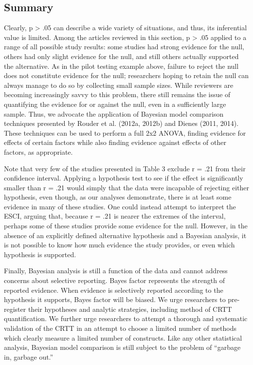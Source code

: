 \documentclass{article}
\begin{document}
\subsection{Summary}
Clearly, p > .05 can describe a wide variety of situations, and thus, its inferential value is limited. Among the articles reviewed in this section, p > .05 applied to a range of all possible study results: some studies had strong evidence for the null, others had only slight evidence for the null, and still others actually supported the alternative. As in the pilot testing example above, failure to reject the null does not constitute evidence for the null; researchers hoping to retain the null can always manage to do so by collecting small sample sizes. While reviewers are becoming increasingly savvy to this problem, there still remains the issue of quantifying the evidence for or against the null, even in a sufficiently large sample. Thus, we advocate the application of Bayesian model comparison techniques presented by Rouder et al. (2012a, 2012b) and Dienes (2011, 2014). These techniques can be used to perform a full 2x2 ANOVA, finding evidence for effects of certain factors while also finding evidence against effects of other factors, as appropriate.

Note that very few of the studies presented in Table 3 exclude r = .21 from their confidence interval. Applying a hypothesis test to see if the effect is significantly smaller than r = .21 would simply that the data were incapable of rejecting either hypothesis, even though, as our analyses demonstrate, there is at least some evidence in many of these studies. One could instead attempt to interpret the ESCI, arguing that, because r = .21 is nearer the extremes of the interval, perhaps some of these studies provide some evidence for the null. However, in the absence of an explicitly defined alternative hypothesis and a Bayesian analysis, it is not possible to know how much evidence the study provides, or even which hypothesis is supported.

Finally, Bayesian analysis is still a function of the data and cannot address concerns about selective reporting. Bayes factor represents the strength of reported evidence. When evidence is selectively reported according to the hypothesis it supports, Bayes factor will be biased. We urge researchers to pre-register their hypotheses and analytic strategies, including method of CRTT quantification. We further urge researchers to attempt a thorough and systematic validation of the CRTT in an attempt to choose a limited number of methods which clearly measure a limited number of constructs. Like any other statistical analysis, Bayesian model comparison is still subject to the problem of “garbage in, garbage out.”
\end{document}
